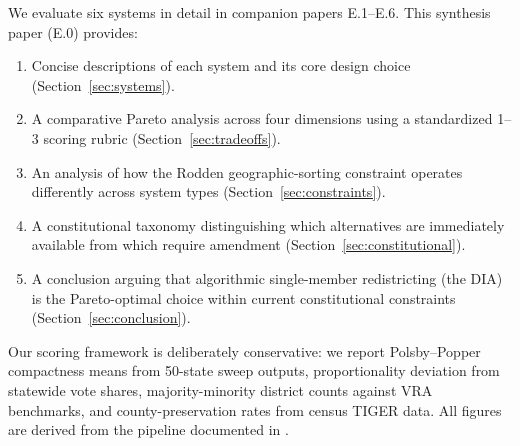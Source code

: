 We evaluate six systems in detail in companion papers E.1--E.6.  This synthesis
paper (E.0) provides:
\begin{enumerate}
  \item Concise descriptions of each system and its core design choice
        (Section~\ref{sec:systems}).
  \item A comparative Pareto analysis across four dimensions using a
        standardized 1--3 scoring rubric (Section~\ref{sec:tradeoffs}).
  \item An analysis of how the Rodden geographic-sorting constraint operates
        differently across system types (Section~\ref{sec:constraints}).
  \item A constitutional taxonomy distinguishing which alternatives are
        immediately available from which require amendment
        (Section~\ref{sec:constitutional}).
  \item A conclusion arguing that algorithmic single-member redistricting
        (the DIA) is the Pareto-optimal choice within current constitutional
        constraints (Section~\ref{sec:conclusion}).
\end{enumerate}

Our scoring framework is deliberately conservative: we report Polsby--Popper
compactness means from 50-state sweep outputs, proportionality deviation from
statewide vote shares, majority-minority district counts against VRA benchmarks,
and county-preservation rates from census TIGER data.  All figures are derived
from the pipeline documented in \citet{dellaLibera2026mec}.
